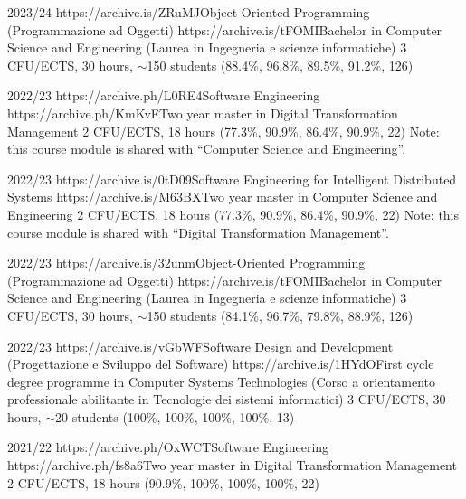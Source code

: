 \begin{outerlist}
    \item[2023/24]
        \unibocourse
        {https://archive.is/ZRuMJ}{Object-Oriented Programming (Programmazione ad Oggetti)}
        {https://archive.is/tFOMI}{Bachelor in Computer Science and Engineering (Laurea in Ingegneria e scienze informatiche)}
        {3 CFU/ECTS, 30 hours, $\sim$150 students}
        {(88.4\%, 96.8\%, 89.5\%, 91.2\%, 126)}
        {\oopjava}
    \item[2022/23]
        \unibocourse %
        {https://archive.ph/L0RE4}{Software Engineering}
        {https://archive.ph/KmKvF}{Two year master in Digital Transformation Management}
        {2 CFU/ECTS, 18 hours}
        {(77.3\%, 90.9\%, 86.4\%, 90.9\%, 22)}
        {
            \sedtmeit{}
            Note: this course module is shared with ``Computer Science and Engineering''.
        }
    \item[2022/23]
        \unibocourse %
        {https://archive.is/0tD09}{Software Engineering for Intelligent Distributed Systems}
        {https://archive.is/M63BX}{Two year master in Computer Science and Engineering}
        {2 CFU/ECTS, 18 hours}
        {(77.3\%, 90.9\%, 86.4\%, 90.9\%, 22)}
        {
            \sedtmeit{}
            Note: this course module is shared with ``Digital Transformation Management''.
        }
    \item[2022/23]
        \unibocourse
        {https://archive.is/32unm}{Object-Oriented Programming (Programmazione ad Oggetti)}
        {https://archive.is/tFOMI}{Bachelor in Computer Science and Engineering (Laurea in Ingegneria e scienze informatiche)}
        {3 CFU/ECTS, 30 hours, $\sim$150 students}
        {(84.1\%, 96.7\%, 79.8\%, 88.9\%, 126)}
        {\oopjava}
    \item[2022/23]
        \unibocourse
        {https://archive.is/vGbWF}{Software Design and Development (Progettazione e Sviluppo del Software)}
        {https://archive.is/1HYdO}{First cycle degree programme in Computer Systems Technologies (Corso a orientamento professionale abilitante in Tecnologie dei sistemi informatici)}
        {3 CFU/ECTS, 30 hours, $\sim$20 students}
        {(100\%, 100\%, 100\%, 100\%, 13)}
        {\oopjava}
    \item[2021/22]
        \unibocourse %
        {https://archive.ph/OxWCT}{Software Engineering}
        {https://archive.ph/fs8a6}{Two year master in Digital Transformation Management}
        {2 CFU/ECTS, 18 hours}
        {(90.9\%, 100\%, 100\%, 100\%, 22)}

\end{outerlist}
